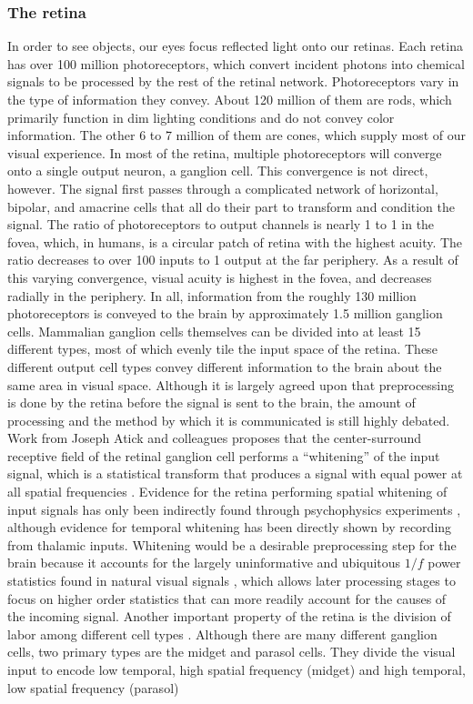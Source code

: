 \subsubsection{The retina}
In order to see objects, our eyes focus reflected light onto our retinas. Each retina has over 100 million photoreceptors, which convert incident photons into chemical signals to be processed by the rest of the retinal network. Photoreceptors vary in the type of information they convey. About 120 million of them are rods, which primarily function in dim lighting conditions and do not convey color information. The other 6 to 7 million of them are cones, which supply most of our visual experience. In most of the retina, multiple photoreceptors will converge onto a single output neuron, a ganglion cell. This convergence is not direct, however. The signal first passes through a complicated network of horizontal, bipolar, and amacrine cells that all do their part to transform and condition the signal. The ratio of photoreceptors to output channels is nearly 1 to 1 in the fovea, which, in humans, is a circular patch of retina with the highest acuity. The ratio decreases to over 100 inputs to 1 output at the far periphery. As a result of this varying convergence, visual acuity is highest in the fovea, and decreases radially in the periphery. In all, information from the roughly 130 million photoreceptors is conveyed to the brain by approximately 1.5 million ganglion cells. Mammalian ganglion cells themselves can be divided into at least 15 different types, most of which evenly tile the input space of the retina. These different output cell types convey different information to the brain about the same area in visual space. Although it is largely agreed upon that preprocessing is done by the retina before the signal is sent to the brain, the amount of processing and the method by which it is communicated is still highly debated. Work from Joseph Atick and colleagues proposes that the center-surround receptive field of the retinal ganglion cell performs a ``whitening'' of the input signal, which is a statistical transform that produces a signal with equal power at all spatial frequencies \parencite{atick1990towards, atick1992what}. Evidence for the retina performing spatial whitening of input signals has only been indirectly found through psychophysics experiments \parencite{atick1992what}, although evidence for temporal whitening has been directly shown \parencite{dong1995statistics} by recording from thalamic inputs. Whitening would be a desirable preprocessing step for the brain because it accounts for the largely uninformative and ubiquitous $1/f$ power statistics found in natural visual signals \parencite{field1999wavelets, field1989statistics}, which allows later processing stages to focus on higher order statistics that can more readily account for the causes of the incoming signal. Another important property of the retina is the division of labor among different cell types \parencite{van1995information}. Although there are many different ganglion cells, two primary types are the midget and parasol cells. They divide the visual input to encode low temporal, high spatial frequency (midget) and high temporal, low spatial frequency (parasol) 